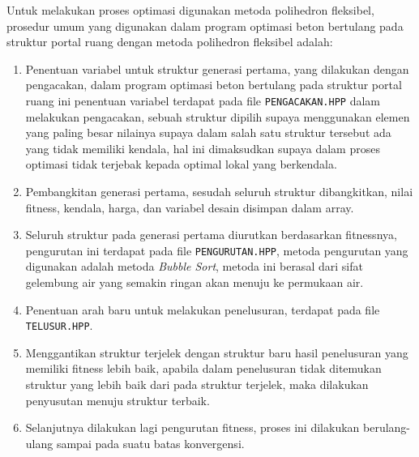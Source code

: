 Untuk melakukan proses optimasi digunakan metoda polihedron fleksibel,
prosedur umum yang digunakan dalam program optimasi beton bertulang pada
struktur portal ruang dengan metoda polihedron fleksibel adalah:
\begin{enumerate}[label=\arabic*.]
\item Penentuan variabel untuk struktur generasi pertama, yang dilakukan
      dengan pengacakan, dalam program optimasi beton bertulang pada
      struktur portal ruang ini penentuan variabel terdapat pada file
      \texttt{PENGACAKAN.HPP} dalam melakukan pengacakan, sebuah struktur
      dipilih supaya menggunakan elemen yang paling besar nilainya
      supaya dalam salah satu struktur tersebut ada yang tidak memiliki
      kendala, hal ini dimaksudkan supaya dalam proses optimasi tidak
      terjebak kepada optimal lokal yang berkendala.
\item Pembangkitan generasi pertama, sesudah seluruh struktur
      dibangkitkan, nilai fitness, kendala, harga, dan variabel desain
      disimpan dalam array.
\item Seluruh struktur pada generasi pertama diurutkan berdasarkan
      fitnessnya, pengurutan ini terdapat pada file
      \texttt{PENGURUTAN.HPP}, metoda pengurutan yang digunakan adalah
      metoda \textit{Bubble Sort}, metoda ini berasal dari sifat
      gelembung air yang semakin ringan akan menuju ke permukaan air.
\item Penentuan arah baru untuk melakukan penelusuran, terdapat pada
      file \texttt{TELUSUR.HPP}.
\item Menggantikan struktur terjelek dengan struktur baru hasil
      penelusuran yang memiliki fitness lebih baik, apabila dalam
      penelusuran tidak ditemukan struktur yang lebih baik dari pada
      struktur terjelek, maka dilakukan penyusutan menuju struktur
      terbaik.
\item Selanjutnya dilakukan lagi pengurutan fitness, proses ini
      dilakukan berulang-ulang sampai pada suatu batas konvergensi.
\end{enumerate}

